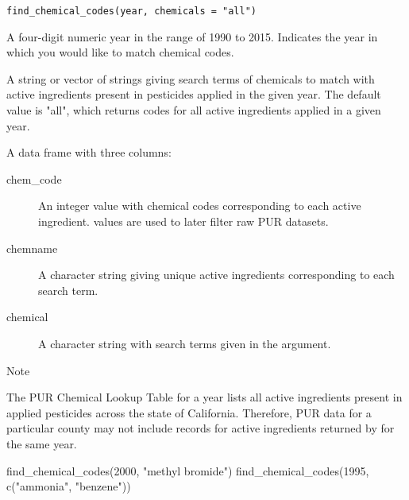 \documentclass[a4paper]{book}
\begin{document}
%
\begin{Usage}
\begin{verbatim}
find_chemical_codes(year, chemicals = "all")
\end{verbatim}
\end{Usage}
%
\begin{Arguments}
\begin{ldescription}
\item[\code{year}] A four-digit numeric year in the range of 1990 to 2015. Indicates
the year in which you would like to match chemical codes.

\item[\code{chemicals}] A string or vector of strings giving search terms of
chemicals to match with active ingredients present in pesticides applied
in the given year. The default value is "all", which returns codes for all
active ingredients applied in a given year.
\end{ldescription}
\end{Arguments}
%
\begin{Value}
A data frame with three columns:
\begin{description}

\item[chem\_code] An integer value with chemical codes corresponding to
each active ingredient.  values are used to later filter
raw PUR datasets.
\item[chemname] A character string giving unique active ingredients
corresponding to each search term.
\item[chemical] A character string with search terms given in the
 argument.

\end{description}

\end{Value}
%
\begin{Section}{Note}

The PUR Chemical Lookup Table for a year lists all active ingredients present
in applied pesticides across the state of California. Therefore, PUR data for
a particular county may not include records for active ingredients returned
by  for the same year.
\end{Section}
%
\begin{Examples}
\begin{ExampleCode}
find_chemical_codes(2000, "methyl bromide")
find_chemical_codes(1995, c("ammonia", "benzene"))
\end{ExampleCode}
\end{Examples}
\end{document}
